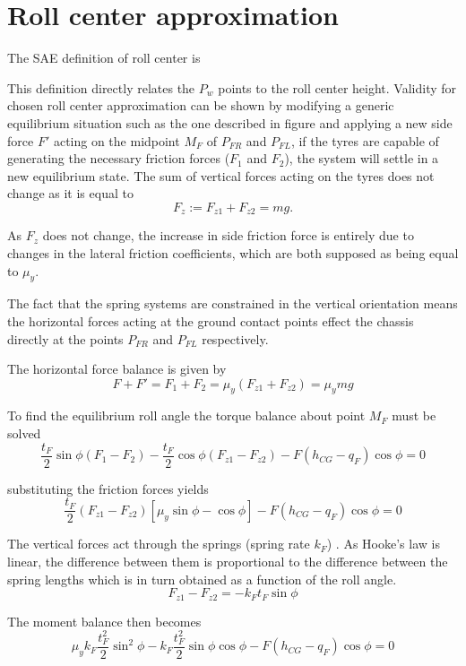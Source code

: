 \chapter{Roll center approximation}
\label{chap:roll}

The SAE definition of roll center is

\textit{}

This definition directly relates the $P_w$ points to the roll center height.
Validity for chosen roll center approximation can be shown by modifying a generic equilibrium situation such as the one described in figure  and applying a new side force $F'$ acting on the midpoint $M_F$ of $P_{FR}$ and $P_{FL}$, if the tyres are capable of generating the necessary friction forces ($F_1$ and $F_2$), the system will settle in a new equilibrium state.
The sum of vertical forces acting on the tyres does not change as it is equal to
$$
F_z := F_{z1}+F_{z2} = mg.
$$

As $F_z$ does not change, the increase in side friction force is entirely due to changes in the lateral friction coefficients, which are both supposed as being equal to $\mu_y$.

The fact that the spring systems are constrained in the vertical orientation means the horizontal forces acting at the ground contact points effect the chassis directly at the points $P_{FR}$ and $P_{FL}$ respectively.

The horizontal force balance is given by
$$
F + F' = F_1 + F_2 = \mu_y ( F_{z1} + F_{z2} ) = \mu_y mg
$$

To find the equilibrium roll angle the torque balance about point $M_F$ must be solved
$$
\frac{t_F}{2} \sin \phi (F_1-F_2) - \frac{t_F}{2} \cos \phi ( F_{z1} - F_{z2} ) - F (h_{CG}-q_F)  \cos \phi = 0
$$

substituting the friction forces yields
$$
\frac{t_F}{2} ( F_{z1} - F_{z2} ) [\mu_y \sin \phi - \cos \phi ] - F (h_{CG}-q_F)  \cos \phi = 0
$$

The vertical forces act through the springs (spring rate $k_F$) . As Hooke's law is linear, the difference between them is proportional to the difference between the spring lengths which is in turn obtained as a function of the roll angle.
$$
F_{z1} - F_{z2} = - k_F t_F \sin \phi
$$

The moment balance then becomes
$$
\mu_y k_F \frac{t_F^2}{2} \sin^2 \phi - k_F \frac{t_F^2}{2} \sin \phi \cos \phi - F(h_{CG}-q_F) \cos \phi = 0
$$

